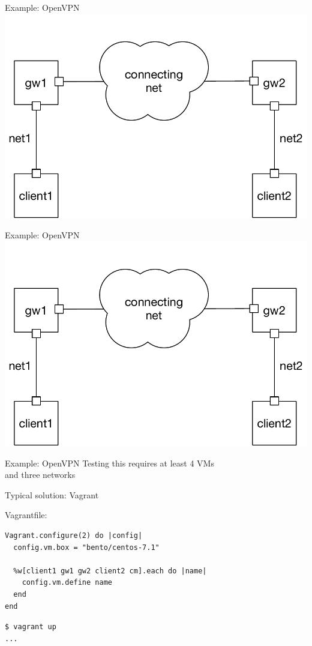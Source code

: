\documentclass[xcolor=svgnames,17pt]{beamer}
\begin{document}
\begin{frame}{Example: OpenVPN}
\includegraphics[max width=0.9\paperwidth,center,page=5]{OpenVPN.pdf}
\end{frame}

\begin{frame}{Example: OpenVPN}
\includegraphics[max width=0.9\paperwidth,center,page=6]{OpenVPN.pdf}
\end{frame}

\begin{frame}{Example: OpenVPN}
\centering
Testing this requires at least 4 VMs \\
and three networks
\end{frame}

\begin{frame}[fragile]{Typical solution: Vagrant}

\small

Vagrantfile:

{
\leftskip=1in
\begin{verbatim}
Vagrant.configure(2) do |config|
  config.vm.box = "bento/centos-7.1"

  %w[client1 gw1 gw2 client2 cm].each do |name|
    config.vm.define name
  end
end
\end{verbatim}
}

\texttt{\$ vagrant up \\ ...}
\end{frame}
\end{document}
